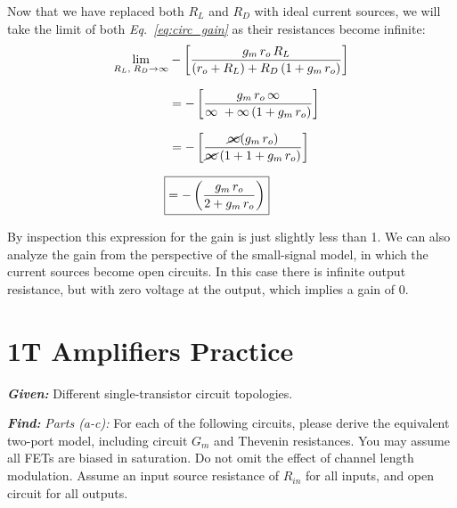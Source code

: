 \documentclass[12pt, fleqn]{article}
\begin{document}
\begin{enumerate}[label=(\alph*)]
{    Now that we have replaced both $R_L$ and $R_D$ with ideal current sources, we will take the limit of both \textit{Eq.~\ref{eq:circ_gain}} as their resistances become infinite:
    \begin{align*}
        \lim_{R_L,\;R_D\to\infty} &-\left[\frac{g_m\,r_o\,R_L}{\left(r_o + R_L\right)+ R_D \left(1 + g_m\,r_o\right)}\right]\\[0.25cm]
        &= -\left[\frac{g_m\,r_o\,\infty}{\infty\ + \infty \left(1 + g_m\,r_o\right)}\right]\\[0.25cm]
        &= -\left[\frac{\cancel{\infty}(g_m\,r_o)}{\cancel{\infty}\left(1 + 1 + g_m\,r_o\right)}\right]\\[0.25cm]
        \Aboxed{&= -\left(\frac{g_m\,r_o}{2 + g_m\,r_o}\right)}
    \end{align*}
    }
    
    By inspection this expression for the gain is just slightly less than 1.  We can also analyze the gain from the perspective of the small-signal model, in which the current sources become open circuits.  In this case there is infinite output resistance, but with zero voltage at the output, which implies a gain of 0.
\end{enumerate}
\newpage
\section{1T Amplifiers Practice}
\textbf{\emph{Given: }} Different single-transistor circuit topologies.

\vspace{0.5cm}
\noindent
\textbf{\emph{Find: }} \textit{Parts (a-c):  }For each of the following circuits, please derive the equivalent two-port model, including circuit $G_m$ and Thevenin resistances. You may assume all FETs are biased in saturation. Do not omit the effect of channel length modulation. Assume an input source resistance of $R_{in}$ for all inputs, and open circuit for all outputs.
\end{document}
